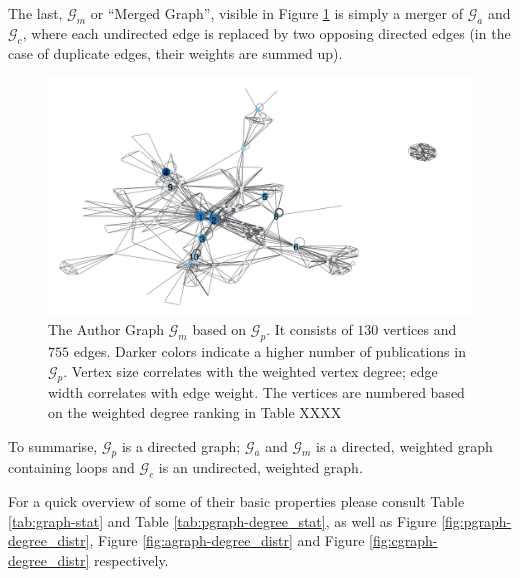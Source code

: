 \documentclass[11pt,a4paper]{book}
\theoremstyle{definition}
\theoremstyle{definition}
\theoremstyle{definition}
\theoremstyle{remark}
\newcommand{\pgraph}{\mathcal{G}_{p}}
\newcommand{\agraph}{\mathcal{G}_{a}}
\newcommand{\cgraph}{\mathcal{G}_{c}}
\newcommand{\acgraph}{\mathcal{G}_{m}}
\begin{document}
The last, $\acgraph$ or ``Merged Graph'', visible in Figure \ref{fig:acgraph-actual_graph} is simply a merger of $\agraph$ and $\cgraph$, where each undirected edge is replaced by two opposing directed edges (in the case of duplicate edges, their weights are summed up).


\begin{figure}[h!]
\includegraphics[width=\textwidth]{mauthor_graph.png}
\caption{The Author Graph  $\acgraph$ based on $\pgraph$. It consists of  $130$ vertices and $755$ edges. 
Darker colors indicate a higher number of publications in $\pgraph$. Vertex size correlates with the weighted vertex degree; 
edge width correlates with edge weight. The vertices are numbered based on the weighted degree ranking in Table XXXX}
\label{fig:acgraph-actual_graph}
\end{figure}

To summarise, $\pgraph$ is a directed graph; $\agraph$ and $\acgraph$ is a directed, weighted graph containing loops and $\cgraph$ is an undirected, weighted graph. 



For a quick overview of some of their basic properties please consult Table \ref{tab:graph-stat} and Table  \ref{tab:pgraph-degree_stat}, as well as Figure \ref{fig:pgraph-degree_distr},  Figure \ref{fig:agraph-degree_distr} and  Figure \ref{fig:cgraph-degree_distr} respectively.
\end{document}

